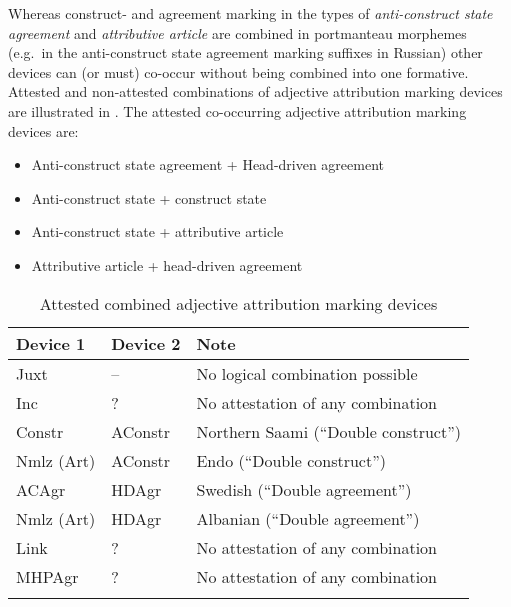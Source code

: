 Whereas construct- and agreement marking in the types of \textit{anti-construct state agreement} and \textit{attributive article} are combined in portmanteau morphemes (e.g.~in the anti-construct state agreement marking suffixes in Russian) other devices can (or must) co-occur without being combined into one formative. Attested and non-attested combinations of adjective attribution marking devices are illustrated in .
The attested co-occurring adjective attribution marking devices are:
\begin{itemize}
\settowidth{}
\item Anti-construct state agreement + Head-driven agreement\\
\item Anti-construct state + construct state 					
\item Anti-construct state + attributive article 				
\item Attributive article + head-driven agreement 			
\end{itemize}
\begin{table}
\begin{tabular}{l | l | l}
\lsptoprule
Device 1 & Device 2 & Note\\
\midrule
Juxt & – & No logical combination possible\\
Inc & ? & No attestation of any combination\\ 
Constr &AConstr &  Northern Saami (“Double construct”)\\
Nmlz (Art) & AConstr & Endo (“Double construct”)\\
ACAgr  & HDAgr & Swedish (“Double agreement”)\\
Nmlz (Art)&HDAgr & Albanian (“Double agreement”)\\
Link & ? & No attestation of any combination\\
MHPAgr & ? & No attestation of any combination\\ 
\lspbottomrule
\end{tabular}
\caption[Attested combined devices]{Attested combined adjective attribution marking devices} \label{nichtkombiniert}
\end{table}

